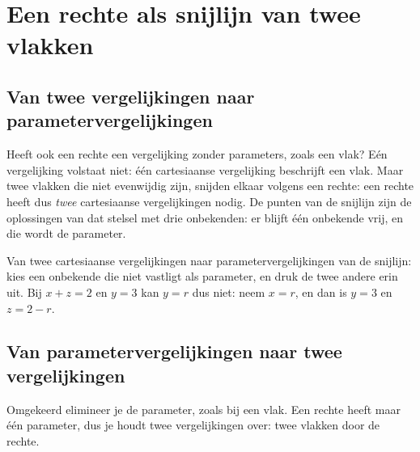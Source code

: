 \section{Een rechte als snijlijn van twee vlakken}

\subsection{Van twee vergelijkingen naar parametervergelijkingen}

Heeft ook een rechte een vergelijking zonder parameters, zoals een vlak? Eén vergelijking volstaat niet: één cartesiaanse vergelijking beschrijft een vlak. Maar twee vlakken die niet evenwijdig zijn, snijden elkaar volgens een rechte: een rechte heeft dus \textit{twee} cartesiaanse vergelijkingen nodig. De punten van de snijlijn zijn de oplossingen van dat stelsel met drie onbekenden: er blijft één onbekende vrij, en die wordt de parameter.


\begin{werkwijze}
Van twee cartesiaanse vergelijkingen naar parametervergelijkingen van de snijlijn: kies een onbekende die niet vastligt als parameter, en druk de twee andere erin uit. Bij $x + z = 2$ en $y = 3$ kan $y = r$ dus niet: neem $x = r$, en dan is $y = 3$ en $z = 2 - r$.
\end{werkwijze}

\begin{oefeningen}
\end{oefeningen}

\subsection{Van parametervergelijkingen naar twee vergelijkingen}

Omgekeerd elimineer je de parameter, zoals bij een vlak. Een rechte heeft maar één parameter, dus je houdt twee vergelijkingen over: twee vlakken door de rechte.

